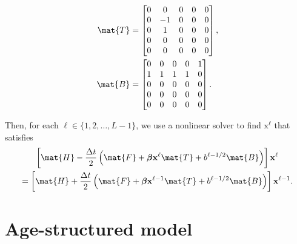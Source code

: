 \documentclass{jpmarticle}
\renewcommand{\vec}[1]{\boldsymbol{\mathrm{#1}}}
\let\subequationsorig\subequations%
\let\endsubequationsorig\endsubequations%
\renewenvironment{subequations}{
  \subequationsorig
  \renewcommand{\theequation}{\theparentequation.\arabic{equation}}
}{
  \endsubequationsorig
}
\begin{document}
\begin{subequations}
\begin{align}
    \mat{T} &=
    \begin{bmatrix}
      0 & 0 & 0 & 0 & 0 \\
      0 & -1 & 0 & 0 & 0 \\
      0 & 1 & 0 & 0 & 0 \\
      0 & 0 & 0 & 0 & 0 \\
      0 & 0 & 0 & 0 & 0
    \end{bmatrix},
    \\
    \mat{B} &=
    \begin{bmatrix}
      0 & 0 & 0 & 0 & 1 \\
      1 & 1 & 1 & 1 & 0 \\
      0 & 0 & 0 & 0 & 0 \\
      0 & 0 & 0 & 0 & 0 \\
      0 & 0 & 0 & 0 & 0
    \end{bmatrix}.
  \end{align}
\end{subequations}
Then, for each $\ell \in \{1, 2, \ldots, L - 1\}$,
we use a nonlinear solver to find $\vec{x}^{\ell}$ that satisfies
\begin{multline}
  \left[
    \mat{H}
    - \frac{\Delta t}{2}
    \left(
      \mat{F}
      + \vec{\beta} \vec{x}^{\ell} \mat{T}
      + b^{\ell - 1 / 2} \mat{B}
    \right)
  \right]
  \vec{x}^{\ell}
  \\
  =
  \left[
    \mat{H}
    + \frac{\Delta t}{2}
    \left(
      \mat{F}
      + \vec{\beta} \vec{x}^{\ell - 1} \mat{T}
      + b^{\ell - 1 / 2} \mat{B}
    \right)
  \right]
  \vec{x}^{\ell - 1}.
\end{multline}


\section{Age-structured model}
\end{document}
